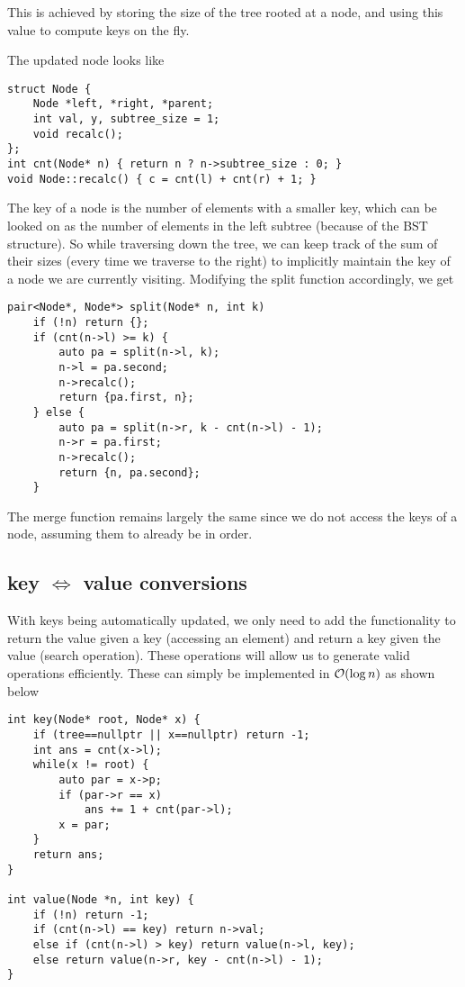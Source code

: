 This is achieved by storing the size of the tree rooted at a node, and using this value to compute keys on the fly.

The updated node looks like

\begin{lstlisting}
struct Node {
    Node *left, *right, *parent;
    int val, y, subtree_size = 1;
    void recalc();
};
int cnt(Node* n) { return n ? n->subtree_size : 0; }
void Node::recalc() { c = cnt(l) + cnt(r) + 1; }
\end{lstlisting}

The key of a node is the number of elements with a smaller key, which can be looked on as the number of elements in the left subtree (because of the BST structure). So while traversing down the tree, we can keep track of the sum of their sizes (every time we traverse to the right) to implicitly maintain the key of a node we are currently visiting.
Modifying the split function accordingly, we get
\begin{lstlisting}
pair<Node*, Node*> split(Node* n, int k)
	if (!n) return {};
	if (cnt(n->l) >= k) {
		auto pa = split(n->l, k);
		n->l = pa.second;
		n->recalc();
		return {pa.first, n};
	} else {
		auto pa = split(n->r, k - cnt(n->l) - 1);
		n->r = pa.first;
		n->recalc();
		return {n, pa.second};
	}
\end{lstlisting}

The merge function remains largely the same since we do not access the keys of a node, assuming them to already be in order.


\subsection{key $\iff$ value conversions}
With keys being automatically updated, we only need to add the functionality to return the value given a key (accessing an element) and return a key given the value (search operation). These operations will allow us to generate valid operations efficiently.
These can simply be implemented in $\mathcal{O}(\log n)$ as shown below
\begin{lstlisting}
int key(Node* root, Node* x) {
    if (tree==nullptr || x==nullptr) return -1;
    int ans = cnt(x->l);
    while(x != root) {
        auto par = x->p;
        if (par->r == x)
            ans += 1 + cnt(par->l);
        x = par;
    }
    return ans;
}

int value(Node *n, int key) {
    if (!n) return -1;
    if (cnt(n->l) == key) return n->val;
    else if (cnt(n->l) > key) return value(n->l, key);
    else return value(n->r, key - cnt(n->l) - 1);
}
\end{lstlisting}

